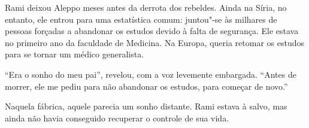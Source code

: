 Rami deixou Aleppo meses antes da derrota dos rebeldes. Ainda na Síria,
no entanto, ele entrou para uma estatística comum: juntou"-se às milhares
de pessoas forçadas a abandonar os estudos devido à falta de segurança.
Ele estava no primeiro ano da faculdade de Medicina. Na Europa, queria
retomar os estudos para se tornar um médico generalista.

``Era o sonho do meu pai'', revelou, com a voz levemente embargada.
``Antes de morrer, ele me pediu para não abandonar os estudos, para
começar de novo.''

Naquela fábrica, aquele parecia um sonho distante. Rami estava à salvo,
mas ainda não havia conseguido recuperar o controle de sua vida.
